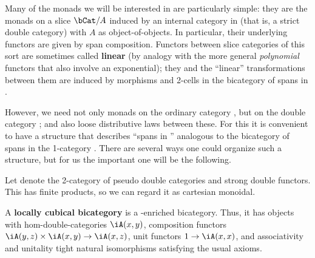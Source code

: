 \documentclass{amsart}
\begin{document}
Many of the monads we will be interested in are particularly simple: they are the monads on a slice $\bCat/A$ induced by an internal category in \bCat (that is, a strict double category) with $A$ as object-of-objects.
In particular, their underlying functors are given by span composition.
Functors between slice categories of this sort are sometimes called \textbf{linear} (by analogy with the more general \emph{polynomial} functors that also involve an exponential); they and the ``linear'' transformations between them are induced by morphisms and 2-cells in the bicategory of spans in \bCat.

However, we need not only monads on the ordinary category \bCat, but on the double category \dCat; and also loose distributive laws between these.
For this it is convenient to have a structure that describes ``spans in \dCat'' analogous to the bicategory of spans in the 1-category \bCat.
There are several ways one could organize such a structure, but for us the important one will be the following.

Let \cDbl denote the 2-category of pseudo double categories and strong double functors.
This has finite products, so we can regard it as cartesian monoidal.

\begin{defn}
  A \textbf{locally cubical bicategory} is a \cDbl-enriched bicategory.
  Thus, it has objects with hom-double-categories $\iA(x,y)$, composition functors $\iA(y,z)\times \iA(x,y) \to \iA(x,z)$, unit functors $1\to \iA(x,x)$, and associativity and unitality tight natural isomorphisms satisfying the usual axioms.
\end{defn}
\end{document}
